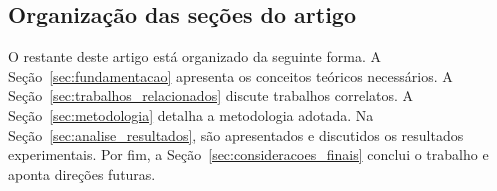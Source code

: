 \subsection{Organização das seções do artigo}
O restante deste artigo está organizado da seguinte forma. A Seção~\ref{sec:fundamentacao} apresenta os conceitos teóricos necessários. A Seção~\ref{sec:trabalhos_relacionados} discute trabalhos correlatos. A Seção~\ref{sec:metodologia} detalha a metodologia adotada. Na Seção~\ref{sec:analise_resultados}, são apresentados e discutidos os resultados experimentais. Por fim, a Seção~\ref{sec:consideracoes_finais} conclui o trabalho e aponta direções futuras.
